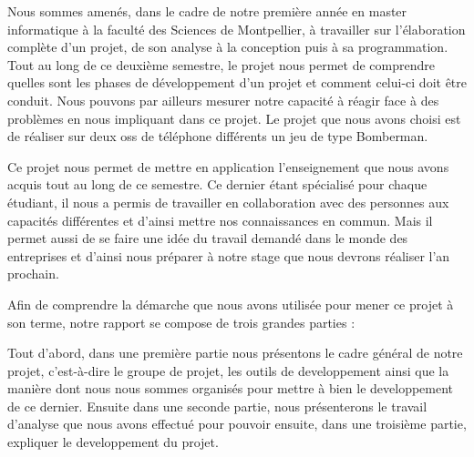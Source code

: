 Nous sommes amenés, dans le cadre de notre première année en master informatique à la faculté des Sciences de Montpellier, à travailler sur l’élaboration complète d’un projet, de son analyse à la conception puis à sa programmation. Tout au long de ce deuxième semestre, le projet nous permet de comprendre quelles sont les phases de développement d’un projet et comment celui-ci doit être conduit. Nous pouvons par ailleurs mesurer notre capacité à réagir face à des problèmes en nous impliquant dans ce projet. Le projet que nous avons choisi est de réaliser sur deux \glspl{os} de téléphone différents un jeu de type Bomberman.

Ce projet nous permet de mettre en application l'enseignement que nous avons acquis tout au long de ce semestre. Ce dernier étant spécialisé pour chaque étudiant, il nous a permis de travailler en collaboration avec des personnes aux capacités différentes et d'ainsi mettre nos connaissances en commun. Mais il permet aussi de se faire une idée du travail demandé dans le monde des entreprises et d'ainsi nous préparer à notre stage que nous devrons réaliser l'an prochain.

Afin de comprendre la démarche que nous avons utilisée pour mener ce projet à son terme, notre rapport se compose de trois grandes parties : 

Tout d'abord, dans une première partie nous présentons le cadre général de notre projet, c'est-à-dire le groupe de projet, les outils de developpement ainsi que la manière dont nous nous sommes organisés pour mettre à bien le developpement de ce dernier. Ensuite dans une seconde partie, nous présenterons le travail d'analyse que nous avons effectué pour pouvoir ensuite, dans une troisième partie, expliquer le developpement du projet.